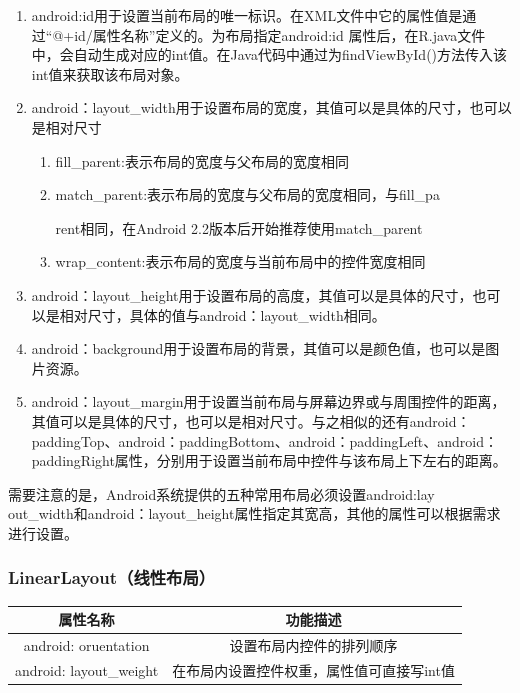\documentclass[UTF8,12pt]{article}
\begin{document}
\begin{enumerate}
    \item android:id用于设置当前布局的唯一标识。在XML文件中它的属性值是通过“@+id/属性名称”定义的。为布局指定android:id 属性后，在R.java文件中，会自动生成对应的int值。在Java代码中通过为findViewById()方法传入该int值来获取该布局对象。
    \item android：layout\_width用于设置布局的宽度，其值可以是具体的尺寸，也可以是相对尺寸
    \begin{enumerate}
        \item fill\_parent:表示布局的宽度与父布局的宽度相同
        \item match\_parent:表示布局的宽度与父布局的宽度相同，与fill\_pa
        
        rent相同，在Android 2.2版本后开始推荐使用match\_parent
        \item wrap\_content:表示布局的宽度与当前布局中的控件宽度相同
    \end{enumerate}
    \item android：layout\_height用于设置布局的高度，其值可以是具体的尺寸，也可以是相对尺寸，具体的值与android：layout\_width相同。
    \item android：background用于设置布局的背景，其值可以是颜色值，也可以是图片资源。
    \item android：layout\_margin用于设置当前布局与屏幕边界或与周围控件的距离，其值可以是具体的尺寸，也可以是相对尺寸。与之相似的还有android：paddingTop、android：paddingBottom、android：paddingLeft、android：paddingRight属性，分别用于设置当前布局中控件与该布局上下左右的距离。
\end{enumerate}

需要注意的是，Android系统提供的五种常用布局必须设置android:lay\\out\_width和android：layout\_height属性指定其宽高，其他的属性可以根据需求进行设置。

\subsubsection{LinearLayout（线性布局）}
\begin{table}[htbp]
    \centering
    \begin{tabular}{cc}
    \hline
    \textbf{属性名称}           & \textbf{功能描述}          \\ \hline
    android: oruentation    & 设置布局内控件的排列顺序           \\
    android: layout\_weight & 在布局内设置控件权重，属性值可直接写int值 \\ \hline
    \end{tabular}
\end{table}
\end{document}
